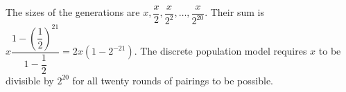 The sizes of the generations are $x,\dfrac{x}{2},\dfrac{x}{2^2},\ldots,\dfrac{x}{2^{20}}$. Their sum is $x\dfrac{1-(\dfrac{1}{2})^{21}}{1-\dfrac{1}{2}}=\boxed{2x(1-2^{-21})}$. The discrete population model requires $x$ to be divisible by $2^{20}$ for all twenty rounds of pairings to be possible.
